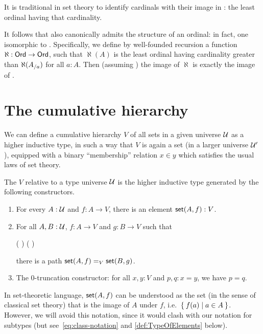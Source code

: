 It is traditional in set theory to identify cardinals with their image in \ord: the least ordinal having that cardinality.

It follows that \card also canonically admits the structure of an ordinal: in fact, one isomorphic to \ord.
Specifically, we define by well-founded recursion a function $\aleph:\ord\to\ord$, such that $\aleph(A)$ is the least ordinal having cardinality greater than $\aleph({\ordsl A a})$ for all $a:A$.
Then (assuming \choice{}) the image of $\aleph$ is exactly the image of \card.

%

%

\section{The cumulative hierarchy}
\label{sec:cumulative-hierarchy}

%
We can define a cumulative hierarchy $V$ of all sets in a given universe $\UU$ as a higher inductive type, in such a way that $V$ is again a set (in a larger universe $\UU'$), equipped with a binary ``membership'' relation $x\in y$ which satisfies the usual laws of set theory.

\begin{defn}\label{defn:V}
  The 
  $V$ relative to a type universe $\UU$ is the
  higher inductive type generated by the following constructors.
  \begin{enumerate}
  \item For every $A : \UU$ and $f : A \to V$, there is an element $\vset(A, f) : V$.
  \item For all $A, B : \UU$, $f : A \to V$ and $g : B \to V$ such that
    \begin{narrowmultline} \label{eq:V-path}
      \big(  \big) \land \narrowbreak
      \big(  \big)
    \end{narrowmultline}
    there is a path $\id[V]{\vset(A,f)}{\vset(B,g)}$.
  \item The 0-truncation constructor: for all $x,y:V$ and $p,q:x=y$, we have $p=q$.
  \end{enumerate}
\end{defn}

In set-theoretic language, $\vset(A,f)$ can be understood as the set (in the sense of classical set theory) that is the image of $A$ under $f$, i.e.\ $\setof{ f(a) | a \in A }$.
However, we will avoid this notation, since it would clash with our notation for subtypes (but see~\eqref{eq:class-notation} and \cref{def:TypeOfElements} below).

